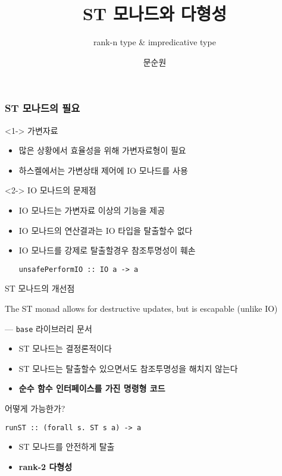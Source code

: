 \documentclass{beamer}
\title{ST 모나드와 다형성}
\subtitle{rank-n type \& impredicative type}
\author{문순원}
\date{}
\begin{document}
\begin{frame}
  \titlepage
\end{frame}

\begin{frame}[fragile]
  \frametitle{ST 모나드의 필요}
  \begin{block}<1-> {가변자료}
    \begin{itemize}
      \item 많은 상황에서 효율성을 위해 가변자료형이 필요\\
      \item 하스켈에서는 가변상태 제어에 IO 모나드를 사용
    \end{itemize}
  \end{block}

  \begin{block}<2-> {IO 모나드의 문제점}
    \begin{itemize}
      \item IO 모나드는 가변자료 이상의 기능을 제공
      \item IO 모나드의 연산결과는 IO 타입을 탈출할수 없다
      \item IO 모나드를 강제로 탈출할경우 참조투명성이 훼손 \\
\begin{verbatim}
unsafePerformIO :: IO a -> a
\end{verbatim}
    \end{itemize}
  \end{block}
\end{frame}

\begin{frame}{ST 모나드의 개선점}
  \begin{displayquote}
    The ST monad allows for destructive updates, but is escapable (unlike IO)
    \par\raggedleft--- \textup{\texttt{base}} 라이브러리 문서
  \end{displayquote}
  \pause
  \begin{itemize}
    \item ST 모나드는 결정론적이다
    \item ST 모나드는 탈출할수 있으면서도 참조투명성을 해치지 않는다
    \item \textbf{순수 함수 인터페이스를 가진 명령형 코드}
  \end{itemize}
\end{frame}

\begin{frame}[fragile] {어떻게 가능한가?}
\begin{verbatim}
runST :: (forall s. ST s a) -> a
\end{verbatim}
  \pause
  \begin{itemize}
    \item ST 모나드를 안전하게 탈출
    \item \textbf{rank-2 다형성}
  \end{itemize}
\end{frame}
\end{document}
